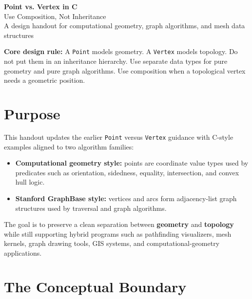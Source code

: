 \documentclass[11pt]{article}
\begin{document}
\begin{center}
  {\Huge\bfseries\color{titleblue} Point vs. Vertex in C}\\[4pt]
  {\Large Use Composition, Not Inheritance}\\[8pt]
  {\normalsize A design handout for computational geometry, graph algorithms, and mesh data structures}
\end{center}

\vspace{0.5em}

\begin{decisionbox}
\textbf{Core design rule:} A \texttt{Point} models geometry. A \texttt{Vertex} models topology. Do not put them in an inheritance hierarchy. Use separate data types for pure geometry and pure graph algorithms. Use composition when a topological vertex needs a geometric position.
\end{decisionbox}

\section{Purpose}

This handout updates the earlier \texttt{Point} versus \texttt{Vertex} guidance with C-style examples aligned to two algorithm families:

\begin{itemize}
  \item \textbf{Computational geometry style:} points are coordinate value types used by predicates such as orientation, sidedness, equality, intersection, and convex hull logic.
  \item \textbf{Stanford GraphBase style:} vertices and arcs form adjacency-list graph structures used by traversal and graph algorithms.
\end{itemize}

The goal is to preserve a clean separation between \textbf{geometry} and \textbf{topology} while still supporting hybrid programs such as pathfinding visualizers, mesh kernels, graph drawing tools, GIS systems, and computational-geometry applications.

\section{The Conceptual Boundary}
\end{document}
